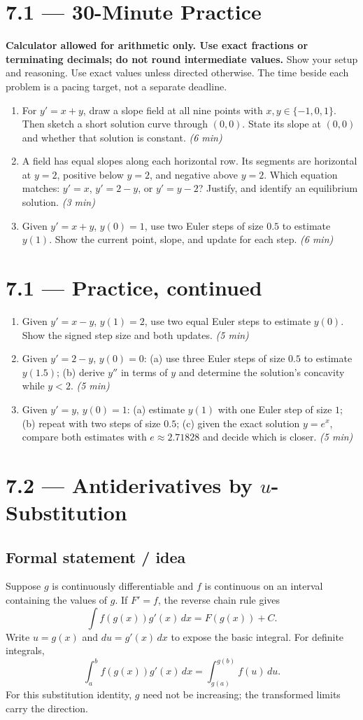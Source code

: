 \documentclass[11pt]{article}
\newcommand{\topic}[2]{\clearpage\section*{#1 --- #2}}
\newcommand{\practice}[2]{\clearpage\section*{#1 --- 30-Minute Practice}\textbf{#2} Show your setup and reasoning. Use exact values unless directed otherwise. The time beside each problem is a pacing target, not a separate deadline.}
\newcommand{\continued}[1]{\clearpage\section*{#1 --- Practice, continued}}
\newcommand{\mins}[1]{\hfill\textit{(#1 min)}}
\newcommand{\dx}{\,dx}
\begin{document}
\practice{7.1}{Calculator allowed for arithmetic only. Use exact fractions or terminating decimals; do not round intermediate values.}
\begin{enumerate}
\item For $y'=x+y$, draw a slope field at all nine points with $x,y\in\{-1,0,1\}$. Then sketch a short solution curve through $(0,0)$. State its slope at $(0,0)$ and whether that solution is constant. \mins{6}
\begin{center}
\end{center}
\item A field has equal slopes along each horizontal row. Its segments are horizontal at $y=2$, positive below $y=2$, and negative above $y=2$.
Which equation matches: $y'=x$, $y'=2-y$, or $y'=y-2$? Justify, and identify an equilibrium solution. \mins{3}
\vfill
\item Given $y'=x+y$, $y(0)=1$, use two Euler steps of size $0.5$ to estimate $y(1)$. Show the current point, slope, and update for each step. \mins{6}
\vfill
\end{enumerate}
\continued{7.1}
\begin{enumerate}[start=4]
\item Given $y'=x-y$, $y(1)=2$, use two equal Euler steps to estimate $y(0)$. Show the signed step size and both updates. \mins{5}
\vfill
\item Given $y'=2-y$, $y(0)=0$:
(a) use three Euler steps of size $0.5$ to estimate $y(1.5)$;
(b) derive $y''$ in terms of $y$ and determine the solution's concavity while $y<2$. \mins{5}
\vfill
\item Given $y'=y$, $y(0)=1$:
(a) estimate $y(1)$ with one Euler step of size $1$;
(b) repeat with two steps of size $0.5$;
(c) given the exact solution $y=e^x$, compare both estimates with $e\approx2.71828$ and decide which is closer. \mins{5}
\vfill
\end{enumerate}

\topic{7.2}{Antiderivatives by $u$-Substitution}
\subsection*{Formal statement / idea}
Suppose $g$ is continuously differentiable and $f$ is continuous on an interval containing the values of $g$. If $F'=f$, the reverse chain rule gives
\[
\int f(g(x))g'(x)\dx=F(g(x))+C.
\]
Write $u=g(x)$ and $du=g'(x)\,dx$ to expose the basic integral.
For definite integrals,
\[
\int_a^b f(g(x))g'(x)\dx=\int_{g(a)}^{g(b)}f(u)\,du.
\]
For this substitution identity, $g$ need not be increasing; the transformed limits carry the direction.
\end{document}
